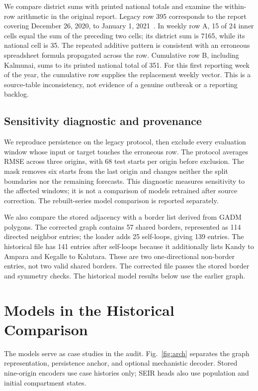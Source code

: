 \documentclass[conference]{IEEEtran}
\begin{document}
We compare district sums with printed national totals and examine the within-row arithmetic in the original report.
Legacy row 395 corresponds to the report covering December 26, 2020, to January 1, 2021~\cite{epid2021wer0248}. %
In weekly row A, 15 of 24 inner cells equal the sum of the preceding two cells; its district sum is 7165, while its national cell is 35. %
The repeated additive pattern is consistent with an erroneous spreadsheet formula propagated across the row.
Cumulative row B, including Kalmunai, sums to its printed national total of 351. %
For this first reporting week of the year, the cumulative row supplies the replacement weekly vector.
This is a source-table inconsistency, not evidence of a genuine outbreak or a reporting backlog.

\subsection{Sensitivity diagnostic and provenance}
We reproduce persistence on the legacy protocol, then exclude every evaluation window whose input or target touches the erroneous row.
The protocol averages RMSE across three origins, with 68 test starts per origin before exclusion. %
The mask removes six starts from the last origin and changes neither the split boundaries nor the remaining forecasts. %
This diagnostic measures sensitivity to the affected windows; it is not a comparison of models retrained after source correction.
The rebuilt-series model comparison is reported separately.

We also compare the stored adjacency with a border list derived from GADM polygons.
The corrected graph contains 57 shared borders, represented as 114 directed neighbor entries; the loader adds 25 self-loops, giving 139 entries. %
The historical file has 141 entries after self-loops because it additionally lists Kandy to Ampara and Kegalle to Kalutara. %
These are two one-directional non-border entries, not two valid shared borders.
The corrected file passes the stored border and symmetry checks.
The historical model results below use the earlier graph.

\section{Models in the Historical Comparison}\label{sec:methods}
The models serve as case studies in the audit.
Fig.~\ref{fig:arch} separates the graph representation, persistence anchor, and optional mechanistic decoder.
Stored nine-origin encoders use case histories only; SEIR heads also use population and initial compartment states.
\end{document}
